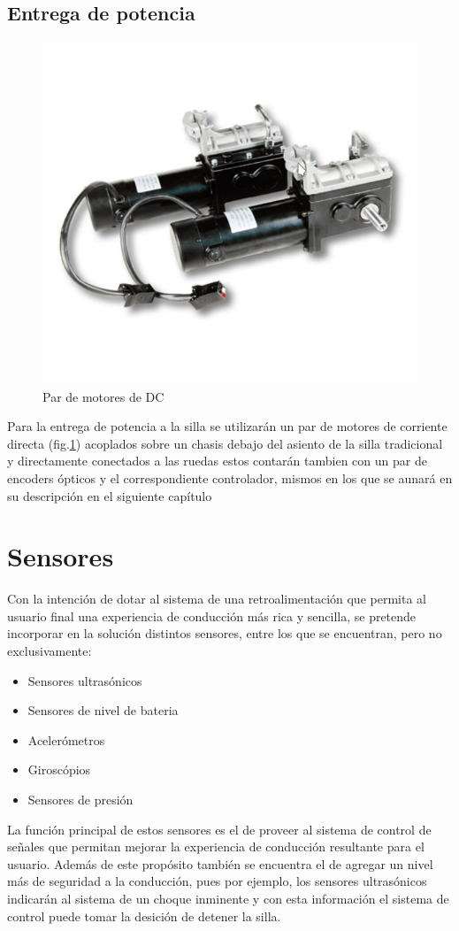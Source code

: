 \subsection{Entrega de potencia}

\begin{figure}[th]
    \centering
    \includegraphics[width=.5\textwidth]{Figures/motor.png}
    \decoRule
    \caption{Par de motores de DC}
    \label{fig:motor}
\end{figure}

Para la entrega de potencia a la silla se utilizar\'an un par de motores de
corriente directa (fig.\ref{fig:motor}) acoplados sobre un chasis debajo del asiento de la silla
tradicional y directamente conectados a las ruedas estos contar\'an tambien con
un par de encoders \'opticos y el correspondiente controlador, mismos en los que
se aunar\'a en su descripci\'on en el siguiente cap\'itulo

\section{Sensores}

Con la intenci\'on de dotar al sistema de una retroalimentaci\'on que permita al
usuario final una experiencia de conducci\'on m\'as rica y sencilla, se pretende
incorporar en la soluci\'on distintos sensores, entre los que se encuentran,
pero no exclusivamente:
\begin{itemize}
    \item Sensores ultras\'onicos
    \item Sensores de nivel de bateria
    \item Aceler\'ometros
    \item Girosc\'opios
    \item Sensores de presi\'on
\end{itemize}

La funci\'on principal de estos sensores es el de proveer al sistema de control
de se\~nales que permitan mejorar la experiencia de conducci\'on resultante para
el usuario. Adem\'as de este prop\'osito tambi\'en se encuentra el de agregar un
nivel m\'as de seguridad a la conducci\'on, pues por ejemplo, los sensores
ultras\'onicos indicar\'an al sistema de un choque inminente y con esta
informaci\'on el sistema de control puede tomar la desici\'on de detener la
silla.
